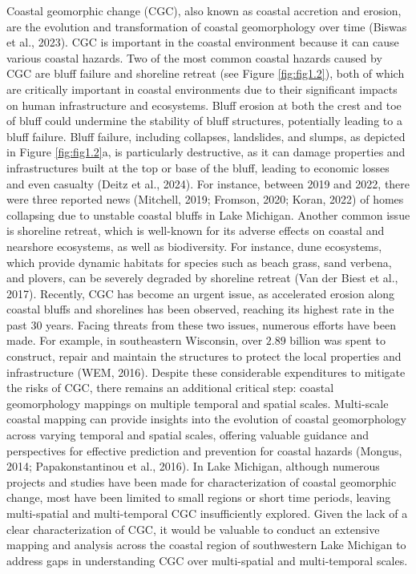 Coastal geomorphic change (CGC), also known as coastal accretion and erosion, are the evolution and transformation of coastal geomorphology over time (Biswas et al., 2023). CGC is important in the coastal environment because it can cause various coastal hazards. Two of the most common coastal hazards caused by CGC are bluff failure and shoreline retreat (see Figure \ref{fig:fig1.2}), both of which are critically important in coastal environments due to their significant impacts on human infrastructure and ecosystems. Bluff erosion at both the crest and toe of bluff could undermine the stability of bluff structures, potentially leading to a bluff failure. Bluff failure, including collapses, landslides, and slumps, as depicted in Figure \ref{fig:fig1.2}a, is particularly destructive, as it can damage properties and infrastructures built at the top or base of the bluff, leading to economic losses and even casualty (Deitz et al., 2024).  For instance, between 2019 and 2022, there were three reported news (Mitchell, 2019; Fromson, 2020; Koran, 2022) of homes collapsing due to unstable coastal bluffs in Lake Michigan. Another common issue is shoreline retreat, which is well-known for its adverse effects on coastal and nearshore ecosystems, as well as biodiversity. For instance, dune ecosystems, which provide dynamic habitats for species such as beach grass, sand verbena, and plovers, can be severely degraded by shoreline retreat (Van der Biest et al., 2017). Recently, CGC has become an urgent issue, as accelerated erosion along coastal bluffs and shorelines has been observed, reaching its highest rate in the past 30 years.  Facing threats from these two issues, numerous efforts have been made. For example, in southeastern Wisconsin, over $2.89$ billion was spent to construct, repair and maintain the structures to protect the local properties and infrastructure (WEM, 2016). Despite these considerable expenditures to mitigate the risks of CGC, there remains an additional critical step: coastal geomorphology mappings on multiple temporal and spatial scales. Multi-scale coastal mapping can provide insights into the evolution of coastal geomorphology across varying temporal and spatial scales, offering valuable guidance and perspectives for effective prediction and prevention for coastal hazards (Mongus, 2014; Papakonstantinou et al., 2016). In Lake Michigan, although numerous projects and studies have been made for characterization of coastal geomorphic change, most have been limited to small regions or short time periods, leaving multi-spatial and multi-temporal CGC insufficiently explored. Given the lack of a clear characterization of CGC, it would be valuable to conduct an extensive mapping and analysis across the coastal region of southwestern Lake Michigan to address gaps in understanding CGC over multi-spatial and multi-temporal scales.

